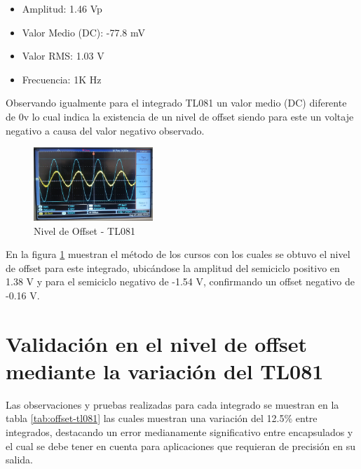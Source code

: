 \documentclass[conference]{IEEEtran}
\begin{document}
	\begin{itemize}
		\item Amplitud: 1.46 Vp
		\item Valor Medio (DC): -77.8 mV
		\item Valor RMS: 1.03 V
		\item Frecuencia: 1K Hz
	\end{itemize}
	
	Observando igualmente para el integrado TL081 un valor medio (DC) diferente de 0v lo cual indica la existencia de un nivel de offset siendo para este un voltaje negativo a causa del valor negativo observado.
	
	\begin{figure}[h]
		\centering
		\includegraphics[width=0.4\textwidth]{media/offset-081}
		\caption{Nivel de Offset - TL081}
		\label{fig:offset-081}
	\end{figure}
	
	En la figura \ref{fig:offset-081} muestran el método de los cursos con los cuales se obtuvo el nivel de offset para este integrado, ubicándose la amplitud del semiciclo positivo en 1.38 V y para el semiciclo negativo de -1.54 V, confirmando un offset negativo de -0.16 V.
	
	\section{Validación en el nivel de offset mediante la variación del TL081}
	
	Las observaciones y pruebas realizadas para cada integrado se muestran en la tabla \ref{tab:offset-tl081} las cuales muestran una variación del 12.5\% entre integrados, destacando un error medianamente significativo entre encapsulados y el cual se debe tener en cuenta para aplicaciones que requieran de precisión en su salida.
	
\end{document}

